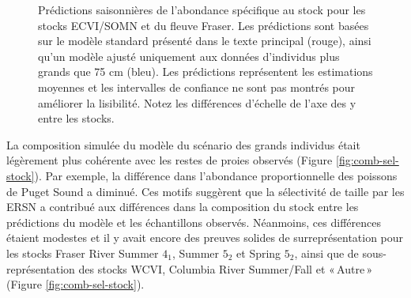 \begin{figure}[H]
    \centering
    \caption{Prédictions saisonnières de l'abondance spécifique au stock pour les stocks ECVI/SOMN et du fleuve Fraser. Les prédictions sont basées sur le modèle standard présenté dans le texte principal (rouge), ainsi qu'un modèle ajusté uniquement aux données d'individus plus grands que 75 cm (bleu). Les prédictions représentent les estimations moyennes et les intervalles de confiance ne sont pas montrés pour améliorer la lisibilité. Notez les différences d'échelle de l'axe des y entre les stocks.}
    \label{fig:comb-pred-stock2}
\end{figure}

La composition simulée du modèle du scénario des grands individus était légèrement plus cohérente avec les restes de proies observés (Figure \ref{fig:comb-sel-stock}). Par exemple, la différence dans l'abondance proportionnelle des poissons de Puget Sound a diminué. Ces motifs suggèrent que la sélectivité de taille par les ERSN a contribué aux différences dans la composition du stock entre les prédictions du modèle et les échantillons observés. Néanmoins, ces différences étaient modestes et il y avait encore des preuves solides de surreprésentation pour les stocks Fraser River Summer $4_1$, Summer $5_2$ et Spring $5_2$, ainsi que de sous-représentation des stocks WCVI, Columbia River Summer/Fall et «\,Autre\,» (Figure \ref{fig:comb-sel-stock}). 

